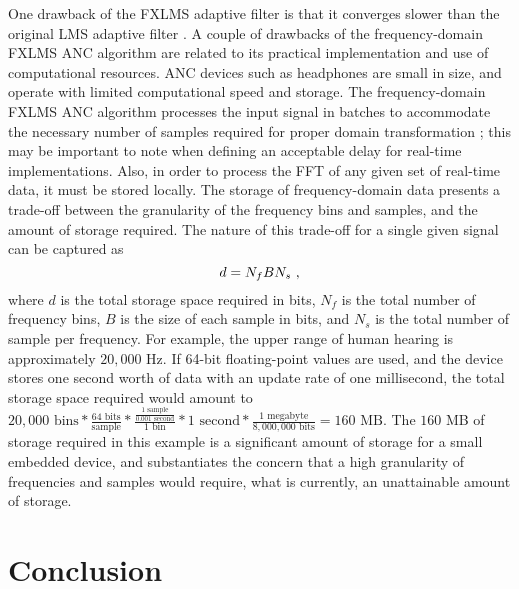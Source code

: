 \documentclass[11pt]{article}
\begin{document}
One drawback of the FXLMS adaptive filter is that it converges slower than the original LMS adaptive filter \cite{gaur}. A couple of drawbacks of the frequency-domain FXLMS ANC algorithm are related to its practical implementation and use of computational resources. ANC devices such as headphones are small in size, and operate with limited computational speed and storage. The frequency-domain FXLMS ANC algorithm processes the input signal in batches to accommodate the necessary number of samples required for proper domain transformation \cite{kuo}; this may be important to note when defining an acceptable delay for real-time implementations. Also, in order to process the FFT of any given set of real-time data, it must be stored locally. The storage of frequency-domain data presents a trade-off between the granularity of the frequency bins and samples, and the amount of storage required. The nature of this trade-off for a single given signal can be captured as
 \begin{equation}
    d = N_f B N_s \text{ ,}
 \end{equation}
where $d$ is the total storage space required in bits, $N_f$ is the total number of frequency bins, $B$ is the size of each sample in bits, and $N_s$ is the total number of sample per frequency. For example, the upper range of human hearing is approximately $20,000$ Hz. If 64-bit floating-point values are used, and the device stores one second worth of data with an update rate of one millisecond, the total storage space required would amount to $20,000 \text{ bins} * \frac{64 \text{ bits}}{\text{sample}} * \frac{\frac{1 \text{ sample}}{0.001 \text{ second}}}{1 \text{ bin}} * 1 \text{ second} * \frac{1 \text{ megabyte}}{8,000,000 \text{ bits}} = 160 \text{ MB}$. The $160$ MB of storage required in this example is a significant amount of storage for a small embedded device, and substantiates the concern that a high granularity of frequencies and samples would require, what is currently, an unattainable amount of storage.

\section{Conclusion}
\end{document}
